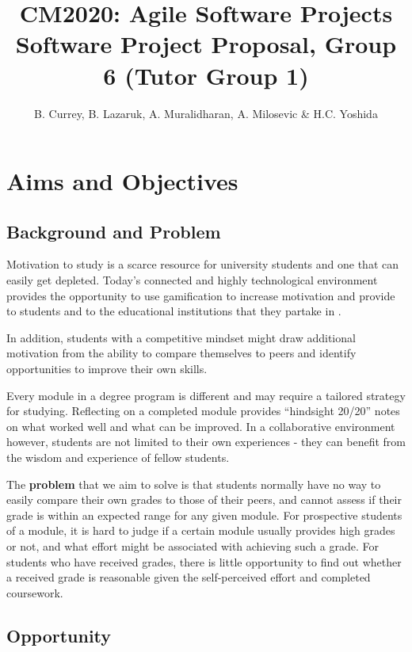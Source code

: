 \title{CM2020: Agile Software Projects \\ Software Project Proposal, Group 6 (Tutor Group 1)}
\author{B. Currey, B. Lazaruk, A. Muralidharan, A. Milosevic \& H.C. Yoshida}




\section{Aims and Objectives}
\subsection{Background and Problem}
Motivation to study is a scarce resource for university students and one that can easily get depleted. Today’s connected and highly technological environment provides the opportunity to use gamification to increase motivation and provide to students and to the educational institutions that they partake in \cite{garciacabot_measuring_2020} \cite{lister_gamification:_2015}. 

In addition, students with a competitive mindset might draw additional motivation from the ability to compare themselves to peers and identify opportunities to improve their own skills.

Every module in a degree program is different and may require a tailored strategy for studying. Reflecting on a completed module provides “hindsight 20/20” notes on what worked well and what can be improved. In a collaborative environment however, students are not limited to their own experiences - they can benefit from the wisdom and experience of fellow students.


The \textbf{problem} that we aim to solve is that students normally have no way to easily compare their own grades to those of their peers, and cannot assess if their grade is within an expected range for any given module. For prospective students of a module, it is hard to judge if a certain module usually provides high grades or not, and what effort might be associated with achieving such a grade. For students who have received grades, there is little opportunity to find out whether a received grade is reasonable given the self-perceived effort and completed coursework.

\subsection{Opportunity}

